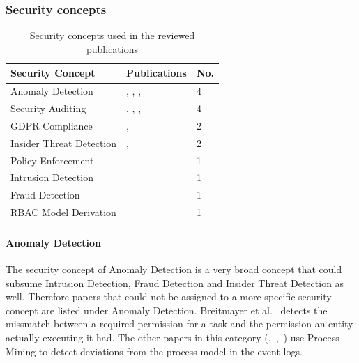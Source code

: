\documentclass[runningheads]{llncs}
\begin{document}
\subsubsection{Security concepts}\label{concepts}
\begin{table}
    \centering
    \caption{Security concepts used in the reviewed publications}
    \label{concepts_table}
    \begin{tabular}{ | l | l | l | }
        \hline
        \textbf{Security Concept} & \textbf{Publications}                                                                           & \textbf{No. } \\
        \hline
        \hline
        Anomaly Detection         & \cite{Fazzinga2020}, \cite{MozafariMehr2022397}, \cite{Breitmayer202411}, \cite{Sarno2020}      & 4             \\
        \hline
        Security Auditing         & \cite{Accorsi20131462}, \cite{Zahoransky2014360}, \cite{Yunizal20221387}, \cite{Dedousis202235} & 4             \\
        \hline
        GDPR Compliance           & \cite{Zaman20192982}, \cite{MozafariMehr202182}                                                 & 2             \\
        \hline
        Insider Threat Detection  & \cite{Zhu201783}, \cite{MacAk2020}                                                              & 2             \\
        \hline
        Policy Enforcement        & \cite{Talamo2013}                                                                               & 1             \\
        \hline
        Intrusion Detection       & \cite{Mishra2018613}                                                                            & 1             \\
        \hline
        Fraud Detection           & \cite{Mardani2013}                                                                              & 1             \\
        \hline
        RBAC Model Derivation     & \cite{Leitner2013719}                                                                           & 1             \\
        \hline
    \end{tabular}
\end{table}
\paragraph{Anomaly Detection} The security concept of Anomaly Detection is a very broad concept that could subsume Intrusion Detection, Fraud Detection and Insider Threat Detection as well. Therefore papers that could not be assigned to a more specific security concept
are listed under Anomaly Detection. Breitmayer et al.~\cite{Breitmayer202411} detects the missmatch between a required permission for a task and the permission an entity actually executing it had. The other papers in this category (\cite{Fazzinga2020},~\cite{MozafariMehr2022397},~\cite{Sarno2020})
use Process Mining to detect deviations from the process model in the event logs.
\end{document}

